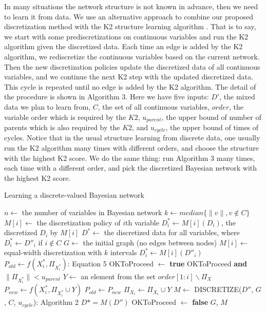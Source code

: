 In many situations the network structure is not known in advance, then we need to learn it from data. We use an alternative approach to combine our proposed discretization method with the K2 structure learning algorithm \citep{K2}. That is to say, we start with some prediscretizations on continuous variables and run the K2 algorithm given the discretized data. Each time an edge is added by the K2 algorithm, we rediscretize the continuous variables based on the current network. Then the new discretization policies update the discretized data of all continuous variables, and we continue the next K2 step with the updated discretized data. This cycle is repeated until no edge is added by the K2 algorithm. The detail of the procedure is shown in Algorithm 3. Here we have five inputs: $D'$, the mixed data we plan to learn from, $C$, the set of all continuous variables, $order$, the variable order which is required by the $K2$, $u_{parent}$, the upper bound of number of parents which is also required by the $K2$, and $u_{cycle}$, the upper bound of times of cycles. Notice that in the usual structure learning from discrete data, one usually run the K2 algorithm many times with different orders, and choose the structure with the highest K2 score. We do the same thing: run Algorithm 3 many times, each time with a different order, and pick the discretized Bayesian network with the highest K2 score.
\begin{algorithm}
\caption{ Learning a discrete-valued Bayesian network}
\begin{algorithmic}[5]
\State

\State $n \leftarrow$ the number of variables in Bayesian network
\State $k \leftarrow median\{ \|v\|, v\notin C\}$
\State $M[i] \leftarrow$ the discretization policy of $i$th variable
\State $D^*_i \leftarrow M[i] (D_i)$, the discretized $D_i$ by $M[i]$
\State $D^* \leftarrow $ the discretized data for all variables, where $D^*_i \leftarrow D''_i$ if $i \notin C$
\State $G \leftarrow$ the initial graph (no edges between nodes)
\State
{}
\State $M[i] \leftarrow$  equal-width discretization with $k$ intervals
\State $D^*_i \leftarrow  M[i] (D''_i)$
\EndIf
\EndFor
\State
{}
\State $P_{old} \leftarrow f(X^*_i,\Pi_{X^*_i})$: Equation 5
\State OKToProceed $\leftarrow$ \textbf{true}
\While OKToProceed \textbf{and} $\|\Pi_{X^*_i}\| < u_{parent}$
\State $Y \leftarrow$ an element from the set $order[1:i] \backslash \Pi_X$
\State $P_{new} \leftarrow f(X^*_i,\Pi_{X^*_i} \cup Y)$
\State $P_{old} \leftarrow P_{new}$
\State $\Pi_{X_i} \leftarrow \Pi_{X_i} \cup Y $
\State $M \leftarrow$ {DISCRETIZE}({$D''$, $G$, $C$, $u_{cycle}$}): Algorithm 2
\State $D* = M(D'')$
\Else
\State OKToProceed $\leftarrow$ \textbf{false}
\EndIf
\EndWhile
\EndFor
\State \Return $G$, $M$
\EndFunction
\end{algorithmic}
\end{algorithm}

